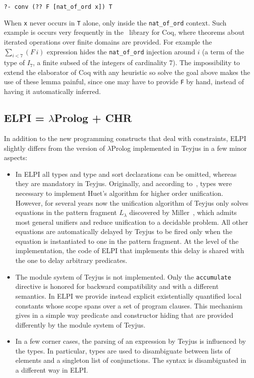 \documentclass{easychair}
\begin{document}
\begin{verbatim}
?- conv (?? F [nat_of_ord x]) T
\end{verbatim}

When \verb+x+ never occurs in \verb+T+ alone, only inside the
\verb+nat_of_ord+ context.  Such example is occurs very frequently
in the~\cite{bigop} library for Coq, where theorems about iterated
operations over finite domains are provided.
For example the $\sum_{i < 7} (F~i)$ expression hides
the \verb+nat_of_ord+ injection around $i$ (a term of the
type of $I_7$, a finite subsed of the integers of cardinality $7$).
The impossibility to extend the elaborator of Coq with any heuristic
so solve the goal above makes the use of these lemma painful, since
one may have to provide \verb+F+ by hand, instead of having it
automatically inferred.

\subsection{ELPI = $\lambda$Prolog + CHR}\label{sec:elpi}

In addition to the new programming constructs that deal with
constraints, ELPI slightly differs from the version of $\lambda$Prolog
implemented in Teyjus in a few minor aspects:
\begin{itemize}
\item In ELPI all types and type and sort declarations can be omitted, whereas
	they are mandatory in Teyjus. Originally, and according
	to~\cite{jlp98}, types were necessary to implement Huet's algorithm for
	higher order unification. However, for several years now the
	unification algorithm of Teyjus only solves equations in the pattern
	fragment $L_\lambda$ discovered by Miller~\cite{patternfrag}, which admits most
	general unifiers and reduce unification to a decidable problem. All
	other equations are automatically delayed by Teyjus to be fired only
	when the equation is instantiated to one in the pattern fragment. At
	the level of the implementation, the code of ELPI that implements this
	delay is shared with the one to delay arbitrary predicates.
\item The module system of Teyjus is not implemented. Only the
	\verb+accumulate+ directive is honored for backward compatibility and
	with a different semantics. In ELPI we provide instead explicit
	existentially quantified local constants whose scope spans over a set
	of program clauses. This mechanism gives in a simple way predicate and
	constructor hiding that are provided differently by the module system
	of Teyjus.
\item In a few corner cases, the parsing of an expression by Teyjus is
	influenced by the types. In particular, types are used to disambiguate
	between lists of elements and a singleton list of conjunctions. The
	syntax is disambiguated in a different way in ELPI.
\end{itemize}
\end{document}
